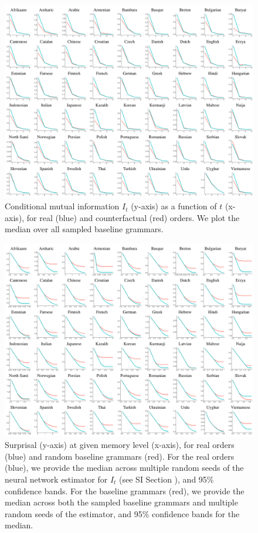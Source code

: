 \begin{figure}
	\begin{center}
\includegraphics[width=\textwidth]{it-table.pdf}
\end{center}
	\caption{Conditional mutual information $I_t$ (y-axis) as a function of $t$ (x-axis), for real (blue) and counterfactual (red) orders. We plot the median over all sampled baseline grammars.}\label{fig:it}
\end{figure}



\begin{figure}
	\begin{center}
\includegraphics[width=\textwidth]{results-table.pdf}
\end{center}
	\caption{Surprisal (y-axis) at given memory level (x-axis), for real orders (blue) and random baseline grammars (red).
	For the real orders (blue), we provide the median across multiple random seeds of the neural network estimator for $I_t$ (see SI Section \REF), and 95\% confidence bands.
	For the baseline grammars (red), we provide the median across both the sampled baseline grammars and multiple random seeds of the estimator, and 95\% confidence bands for the median.
}\label{fig:median-table}
\end{figure}


